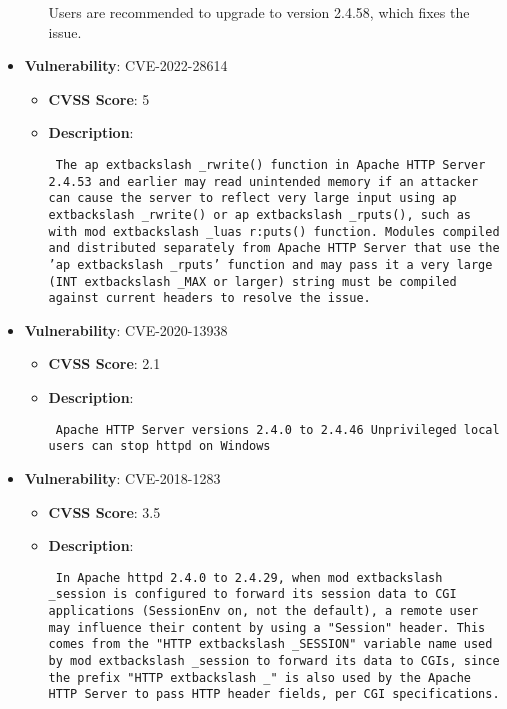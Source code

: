 \documentclass{article}
\begin{document}
\begin{itemize}
\begin{itemize}
{{Users are recommended to upgrade to version 2.4.58, which fixes the issue.
 }}
        \end{itemize}
    
        \item \textbf{Vulnerability}: CVE-2022-28614
        \begin{itemize}
            \item \textbf{CVSS Score}:  5 
            \item \textbf{Description}: \parbox{\linewidth}{\texttt{ The ap	extbackslash _rwrite() function in Apache HTTP Server 2.4.53 and earlier may read unintended memory if an attacker can cause the server to reflect very large input using ap	extbackslash _rwrite() or ap	extbackslash _rputs(), such as with mod	extbackslash _luas r:puts() function. Modules compiled and distributed separately from Apache HTTP Server that use the 'ap	extbackslash _rputs' function and may pass it a very large (INT	extbackslash _MAX or larger) string must be compiled against current headers to resolve the issue. }}
        \end{itemize}
    
        \item \textbf{Vulnerability}: CVE-2020-13938
        \begin{itemize}
            \item \textbf{CVSS Score}:  2.1 
            \item \textbf{Description}: \parbox{\linewidth}{\texttt{ Apache HTTP Server versions 2.4.0 to 2.4.46 Unprivileged local users can stop httpd on Windows }}
        \end{itemize}
    
        \item \textbf{Vulnerability}: CVE-2018-1283
        \begin{itemize}
            \item \textbf{CVSS Score}:  3.5 
            \item \textbf{Description}: \parbox{\linewidth}{\texttt{ In Apache httpd 2.4.0 to 2.4.29, when mod	extbackslash _session is configured to forward its session data to CGI applications (SessionEnv on, not the default), a remote user may influence their content by using a "Session" header. This comes from the "HTTP	extbackslash _SESSION" variable name used by mod	extbackslash _session to forward its data to CGIs, since the prefix "HTTP	extbackslash _" is also used by the Apache HTTP Server to pass HTTP header fields, per CGI specifications. }}
        \end{itemize}
    

\end{itemize}
\end{document}
